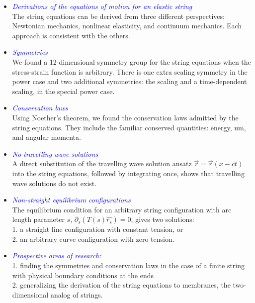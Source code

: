 \documentclass[landscape]{slides}
\def\myemph#1{\textcolor{blue}{\em #1}}
\begin{document}
\begin{itemize}
\item
\myemph{Derivations of the equations of motion for an elastic string}
\\
The string equations can be derived from three different perspectives: 
Newtonian mechanics, nonlinear elasticity, and continuum mechanics. 
Each approach is consistent with the others.
\item 
\myemph{Symmetries}
\\
We found a 12-dimensional symmetry group for the string equations when the stress-strain function is arbitrary.
There is one extra scaling symmetry in the power case and two additional symmetries: 
the scaling and a time-dependent scaling, in the special power case.
\item
\myemph{Conservation laws}
\\
Using Noether's theorem, we found the conservation laws admitted by the string equations. They include the familiar conserved quantities: energy, um, and angular momenta.
\newpage
\item
\myemph{No travelling wave solutions}
\\
A direct substitution of the travelling wave solution ansatz $\vec{r} = \vec{r}(x - ct)$ into the string equations, followed by integrating once, shows that travelling wave solutions do not exist. 
\item 
\myemph{Non-straight equilibrium configurations}
\\
The equilibrium condition for an arbitrary string configuration with arc length parameter $s$, $\partial_s (T(s)\widehat{r_s}) = 0$, gives two solutions:
\\
1. a straight line configuration with constant tension, or
\\
2. an arbitrary curve configuration with zero tension. 
\item  
\myemph{Prospective areas of research:}
\\
1. finding the symmetries and conservation laws in the case of a finite string with physical boundary conditions at the ends 
\\
2. generalizing the derivation of the string equations to membranes, the two-dimensional analog of strings.
\end{itemize}
\end{document}
